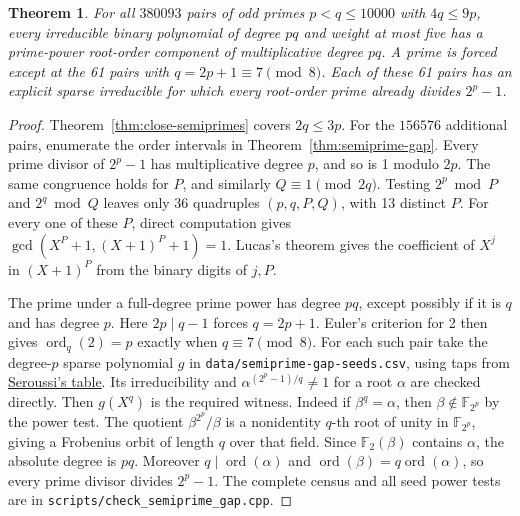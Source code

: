 \documentclass[11pt]{article}
\newtheorem{theorem}{Theorem}
\newcommand{\ord}{\operatorname{ord}}
\begin{document}
\begin{theorem}\label{thm:10000-semiprimes}
For all \(380093\) pairs of odd primes \(p<q\le10000\) with
\(4q\le9p\), every irreducible binary polynomial of degree \(pq\)
and weight at most five has a prime-power root-order component of
multiplicative degree \(pq\). A prime is forced except at the 61
pairs with \(q=2p+1\equiv7\pmod8\). Each of these 61 pairs has an
explicit sparse irreducible for which every root-order prime already
divides \(2^p-1\).
\end{theorem}
\begin{proof}
Theorem~\ref{thm:close-semiprimes} covers \(2q\le3p\).
For the \(156576\) additional pairs, enumerate the order intervals in
Theorem~\ref{thm:semiprime-gap}. Every prime divisor of \(2^p-1\) has
multiplicative degree \(p\), and so is 1 modulo \(2p\). The same
congruence holds for \(P\), and similarly \(Q\equiv1\pmod{2q}\).
Testing \(2^p\bmod P\) and \(2^q\bmod Q\) leaves only 36 quadruples
\((p,q,P,Q)\), with 13 distinct \(P\). For every one of these \(P\),
direct computation gives \(\gcd(X^P+1,(X+1)^P+1)=1\).
Lucas's theorem gives the coefficient of \(X^j\) in \((X+1)^P\)
from the binary digits of \(j,P\).

The prime under a full-degree prime power has degree \(pq\), except
possibly if it is \(q\) and has degree \(p\).
Here \(2p\mid q-1\) forces \(q=2p+1\). Euler's criterion for 2 then
gives \(\operatorname{ord}_q(2)=p\) exactly when \(q\equiv7\pmod8\).
For each such pair take the degree-\(p\) sparse polynomial \(g\) in
\nolinkurl{data/semiprime-gap-seeds.csv}, using taps from
\href{https://shiftleft.com/mirrors/www.hpl.hp.com/techreports/98/HPL-98-135.pdf}
{Seroussi's table}. Its irreducibility and
\(\alpha^{(2^p-1)/q}\ne1\) for a root \(\alpha\) are checked directly.
Then \(g(X^q)\) is the required witness. Indeed if \(\beta^q=\alpha\),
then \(\beta\notin\mathbb F_{2^p}\) by the power test. The quotient
\(\beta^{2^p}/\beta\) is a nonidentity \(q\)-th root of unity in
\(\mathbb F_{2^p}\), giving a Frobenius orbit of length \(q\) over
that field. Since \(\mathbb F_2(\beta)\) contains \(\alpha\), the
absolute degree is \(pq\). Moreover \(q\mid\ord(\alpha)\) and
\(\ord(\beta)=q\ord(\alpha)\), so every prime divisor divides
\(2^p-1\). The complete census and all seed power tests are in
\nolinkurl{scripts/check_semiprime_gap.cpp}.
\end{proof}
\end{document}
